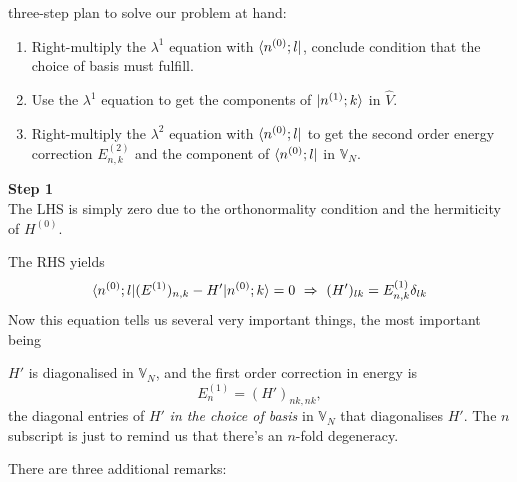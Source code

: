 three-step plan to solve our problem at hand:
\begin{enumerate}
	\item Right-multiply the $\lambda^1$ equation with $\langle n^{(0)};l|$, conclude condition that the choice of basis must fulfill.
	\item Use the $\lambda^1$ equation to get the components of $|n^{(1)};k\rangle$ in $\hat{V}$.
	\item Right-multiply the $\lambda^2$ equation with $\langle n^{(0)};l|$ to get the second order energy correction $E^{(2)}_{n,k} $ and the component of $\langle n^{(0)};l|$ in $\mathbb{V}_N$.
\end{enumerate}
\textbf{Step 1}\\
The LHS is simply zero due to the orthonormality condition and the hermiticity of $H^{(0)}$. \par
The RHS yields
\begin{equation}
\label{6240}
\lgl n^{(0)};l|(E^{(1)})_{n,k}-H'|n^{(0)};k \rgl=0\ \imp\ 
(H')_{lk}=E_{n,k}^{(1)}\delta_{lk}
\end{equation}
Now this equation tells us several very important things, the most important being
\begin{thrm}[Diagonalisation of $H'$]
$H'$ is diagonalised in $\mathbb{V}_N$, and the first order correction in energy is 
\begin{equation}
E_n^{(1)}=(H')_{nk,nk}, 
\end{equation}
the diagonal entries of $H'$ \textit{in the choice of basis} in 
$\mathbb{V}_N$ that diagonalises $H'$. The $n$ subscript is just to 
remind us that there's an $n$-fold degeneracy. 
\end{thrm}
There are three additional remarks:
